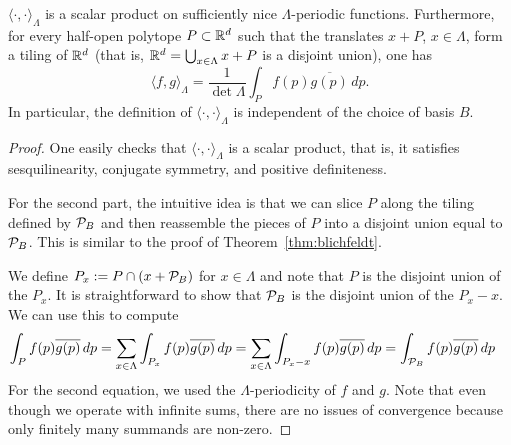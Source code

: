 \begin{lemma}
  $\langle \cdot, \cdot \rangle_\Lambda$ is a scalar product on
  sufficiently nice $\Lambda$-periodic functions.
  Furthermore, for every half-open polytope $P \subset \mathbb{R}^d$ such that
  the translates $x + P$, $x \in \Lambda$, form a tiling of $\mathbb{R}^d$
  (that is, $\mathbb{R}^d = \bigcup_{x\in \Lambda} x + P$ is a disjoint union),
  one has
  \[
    \langle f, g \rangle_\Lambda = \frac{1}{\det \Lambda} \int_{P} f(p) \overline{g(p)} \,dp.
  \]
  In particular, the definition of $\langle \cdot, \cdot \rangle_\Lambda$
  is independent of the choice of basis $B$.
\end{lemma}
\begin{proof}
  One easily checks that $\langle \cdot, \cdot \rangle_\Lambda$
  is a scalar product, that is, it satisfies sesquilinearity, conjugate symmetry, and positive definiteness.

  For the second part,
  the intuitive idea is that we can slice $P$ along the tiling defined by $\mathcal{P}_B$
  and then reassemble the pieces of $P$ into a disjoint union
  equal to $\mathcal{P}_B$.
  This is similar to the proof of Theorem~\ref{thm:blichfeldt}.

  We define $P_x := P \cap (x + \mathcal{P}_B)$ for $x \in \Lambda$
  and note that $P$ is the disjoint union of the $P_x$.
  It is straightforward to show that $\mathcal{P}_B$ is the disjoint union of the $P_x - x$.
  We can use this to compute
  \begin{align*}
    \int_P f(p) \overline{g(p)} \,dp &= \sum_{x \in \Lambda} \int_{P_x} f(p) \overline{g(p)} \,dp
      = \sum_{x \in \Lambda} \int_{P_x - x} f(p) \overline{g(p)} \,dp
      = \int_{\mathcal{P}_B} f(p) \overline{g(p)} \,dp
  \end{align*}
  For the second equation, we used the $\Lambda$-periodicity of $f$ and $g$.
  Note that even though we operate with infinite sums,
  there are no issues of convergence because only finitely many summands are non-zero.
\end{proof}

